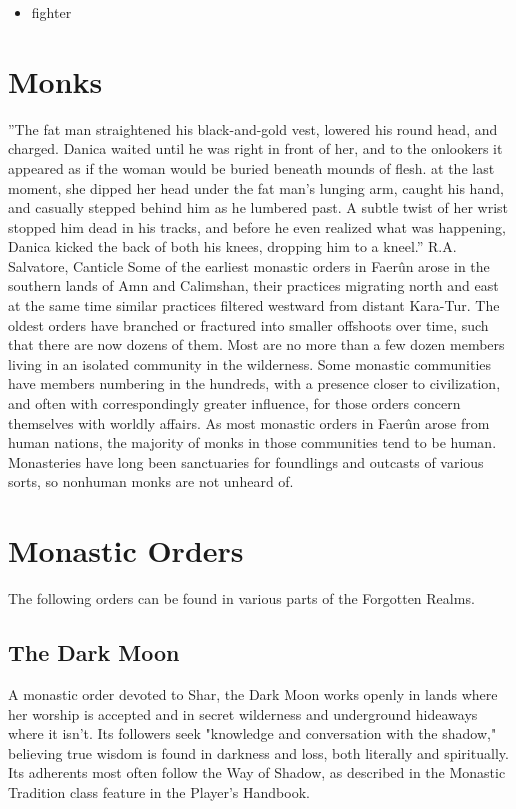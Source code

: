 \documentclass[10pt,a4paper,twoside,twocolumn,openany,bg=print,nodeprecatedcode]{dndbook}
\begin{document}
\begin{itemize}
\item fighter
\end{itemize}

\section{Monks}
\DndQuote%
{}
{''The fat man straightened his black-and-gold vest, lowered his round head, and charged. Danica waited until he was right in front of her, and to the onlookers it appeared as if the woman would be buried beneath mounds of flesh. at the last moment, she dipped her head under the fat man's lunging arm, caught his hand, and casually stepped behind him as he lumbered past. A subtle twist of her wrist stopped him dead in his tracks, and before he even realized what was happening, Danica kicked the back of both his knees, dropping him to a kneel.''}
{R.A. Salvatore, Canticle}
Some of the earliest monastic orders in Faerûn arose in the southern lands of Amn and Calimshan, their practices migrating north and east at the same time similar practices filtered westward from distant Kara-Tur.
The oldest orders have branched or fractured into smaller offshoots over time, such that there are now dozens of them. Most are no more than a few dozen members living in an isolated community in the wilderness. Some monastic communities have members numbering in the hundreds, with a presence closer to civilization, and often with correspondingly greater influence, for those orders concern themselves with worldly affairs.
As most monastic orders in Faerûn arose from human nations, the majority of monks in those communities tend to be human. Monasteries have long been sanctuaries for foundlings and outcasts of various sorts, so nonhuman monks are not unheard of.
\section{Monastic Orders}
The following orders can be found in various parts of the Forgotten Realms.
\subsection{The Dark Moon}
A monastic order devoted to Shar, the Dark Moon works openly in lands where her worship is accepted and in secret wilderness and underground hideaways where it isn't. Its followers seek "knowledge and conversation with the shadow," believing true wisdom is found in darkness and loss, both literally and spiritually. Its adherents most often follow the Way of Shadow, as described in the Monastic Tradition class feature in the Player's Handbook.
\end{document}
